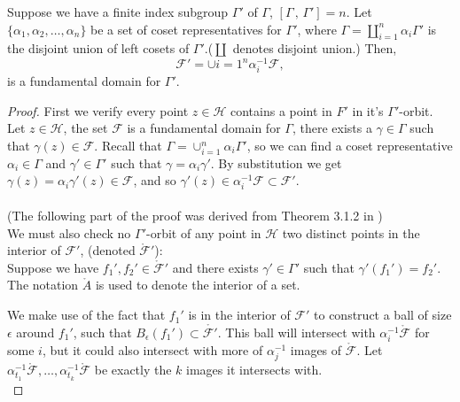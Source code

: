 \begin{proposition}\label{prop:fundDomainCosetReps}
Suppose we have a finite index subgroup $\Gamma'$ of $\Gamma$, $ [ \Gamma \, , \, \Gamma'] =n$. Let $\{\alpha_1, \alpha_2, \ldots, \alpha_n \}$ be a set of coset representatives for $\Gamma'$, where $\Gamma = \coprod_{i =1}^n \alpha_i\Gamma'$ is the disjoint union of left cosets of $\Gamma'$.($\coprod$ denotes disjoint union.)
Then,
$$\mathcal{F}' = \cup{i=1}^n \alpha_i^{-1}\mathcal{F},$$
is a fundamental domain for $\Gamma'$.

\end{proposition}

\begin{proof}
First we verify every point $z \in \mathcal{H}$ contains a point in $F'$ in it's $\Gamma'$-orbit.\\
Let $z \in \mathcal{H}$, the set $\mathcal{F}$ is a fundamental domain for $\Gamma$, there exists a $\gamma \in \Gamma$ such that $\gamma (z) \in \mathcal{F}$. Recall that $\Gamma = \cup_{i =1}^n \alpha_i \Gamma'$, so we can find a coset representative $\alpha_i \in \Gamma$ and $\gamma' \in \Gamma'$ such that $\gamma = \alpha_i \gamma'$. By substitution we get $\gamma( z) = \alpha_i \gamma'(z) \in \mathcal{F}$, and so $\gamma'(z) \in \alpha_i^{-1} \mathcal{F} \subset \mathcal{F}'$. \\
\\
(The following part of the proof was derived from Theorem 3.1.2 in \citep{katok})\\
We must also check no $\Gamma'$-orbit of any point in $\mathcal{H}$ two distinct points in the interior of $\mathcal{F}'$, (denoted $\mathring{\mathcal{F}}'$): \\
Suppose we have $f_1', f_2' \in  \mathring{\mathcal{F}}'$ and there exists $\gamma' \in \Gamma'$ such that $\gamma' (f_1') =f_2'$. \\


The notation $\mathring{A}$ is used to denote the interior of a set.

We make use of the fact that $f_1'$ is in the interior of $\mathcal{F}'$ to construct a ball of size $\epsilon$ around $f_1'$, such that $B_\epsilon(f_1') \subset \mathring{\mathcal{F}'}$. This ball will intersect with $\alpha_i^{-1} \mathring{\mathcal{F}}$ for some $i$, but it could also intersect with more of $\alpha_j^{-1}$ images of $\mathring{\mathcal{F}}$. Let $\alpha_{t_1}^{-1}\mathring{\mathcal{F}}, \ldots , \alpha_{t_k}^{-1}\mathring{\mathcal{F}}$ be exactly the $k$ images it intersects with. 
\\


\end{proof}
